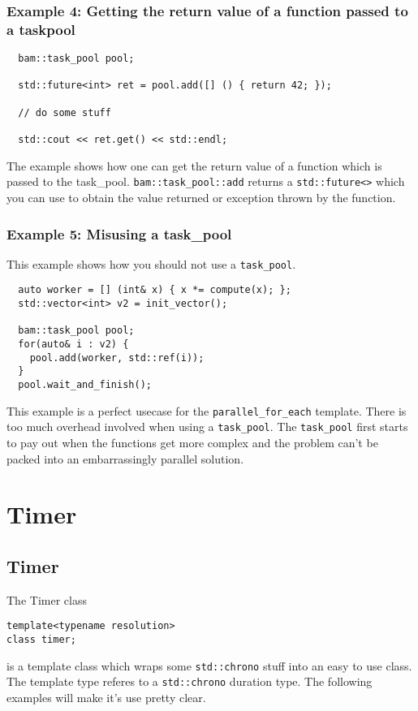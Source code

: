 \documentclass[11pt, a4paper]{article}
\begin{document}
\subsubsection{Example 4: Getting the return value of a function passed to a taskpool}
\begin{lstlisting}
  bam::task_pool pool;

  std::future<int> ret = pool.add([] () { return 42; });

  // do some stuff

  std::cout << ret.get() << std::endl;

\end{lstlisting}
The example shows how one can get the return value of a function which is passed to the task\_pool. \texttt{bam::task\_pool::add} returns a \texttt{std::future<>} which you can use to obtain the value returned or exception thrown by the function. 
\subsubsection{Example 5: Misusing a task\_pool}
This example shows how you should not use a \texttt{task\_pool}.

\begin{lstlisting}
  auto worker = [] (int& x) { x *= compute(x); };
  std::vector<int> v2 = init_vector();

  bam::task_pool pool;
  for(auto& i : v2) {
    pool.add(worker, std::ref(i));
  }
  pool.wait_and_finish();
\end{lstlisting}
This example is a perfect usecase for the \texttt{parallel\_for\_each} template. There is too much overhead involved when using a \texttt{task\_pool}. The \texttt{task\_pool} first starts to pay out when the functions get more complex and the problem can't be packed into an embarrassingly parallel solution.

\section{Timer}
\subsection{Timer}

The Timer class 
\begin{lstlisting}
template<typename resolution>
class timer;
\end{lstlisting}

 is a template class which wraps some \texttt{std::chrono} stuff into an easy to use class. The template type referes to a \texttt{std::chrono} duration type. The following examples  will make it's use pretty clear.
\end{document}
